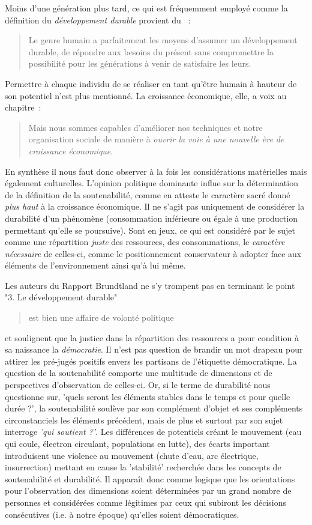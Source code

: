 %
Moins d'une génération plus tard, ce qui est fréquemment employé comme la définition du \emph{développement durable} provient du  \citeyear{brundtland_rapport_1987}~:
\blockcquote{brundtland_rapport_1987}
{Le genre humain a parfaitement les moyens d’assumer un développement durable, de répondre aux besoins du présent sans compromettre la possibilité pour les générations à venir de satisfaire les leurs.}
Permettre à chaque individu de se réaliser en tant qu'être humain à hauteur de son potentiel n'est plus mentionné.
La croissance économique, elle, a voix au chapitre~:
\blockcquote{brundtland_rapport_1987}
{Mais nous sommes capables d’améliorer nos techniques et notre organisation sociale de manière à \emph{ouvrir la voie à une nouvelle ère de croissance économique}.}

En synthèse il nous faut donc observer à la fois les considérations matérielles mais également culturelles.
L'opinion politique dominante influe sur la détermination de la définition de la soutenabilité, comme en atteste le caractère sacré donné \emph{plus haut} à la croissance économique.
Il ne s'agit pas uniquement de considérer la durabilité d'un phénomène (consommation inférieure ou égale à une production permettant qu'elle se poursuive).
Sont en jeux, ce qui est considéré par le sujet comme une répartition \emph{juste} des ressources, des consommations, le \emph{caractère nécessaire} de celles-ci, comme le positionnement conservateur à adopter face aux éléments de l'environnement ainsi qu'à lui même.

Les auteurs du Rapport Brundtland ne s'y trompent pas en terminant le point "3. Le développement durable"~\blockcquote{brundtland_rapport_1987}
{est bien une affaire de volonté politique} et soulignent que la justice dans la répartition des ressources a pour condition à sa naissance la \emph{démocratie}.
Il n'est pas question de brandir un mot drapeau pour attirer les pré-jugés positifs envers les partisans de l'étiquette démocratique.
La question de la soutenabilité comporte une multitude de dimensions et de perspectives d'observation de celles-ci.
Or, si le terme de durabilité nous questionne sur, 'quels seront les éléments stables dans le temps et pour quelle durée ?', la soutenabilité soulève par son complément d'objet et ses compléments circonstanciels les éléments précédent, mais de plus et surtout par son sujet interroge \emph{'qui soutient ?'}.
Les différences de potentiels créant le mouvement (eau qui coule, électron circulant, populations en lutte), des écarts important introduisent une violence au mouvement (chute d'eau, arc électrique, insurrection) mettant en cause la 'stabilité' recherchée dans les concepts de soutenabilité et durabilité.
Il apparaît donc comme logique que les orientations pour l'observation des dimensions soient déterminées par un grand nombre de personnes et considérées comme légitimes par ceux qui subiront les décisions consécutives (i.e. à notre époque) qu'elles soient démocratiques.

